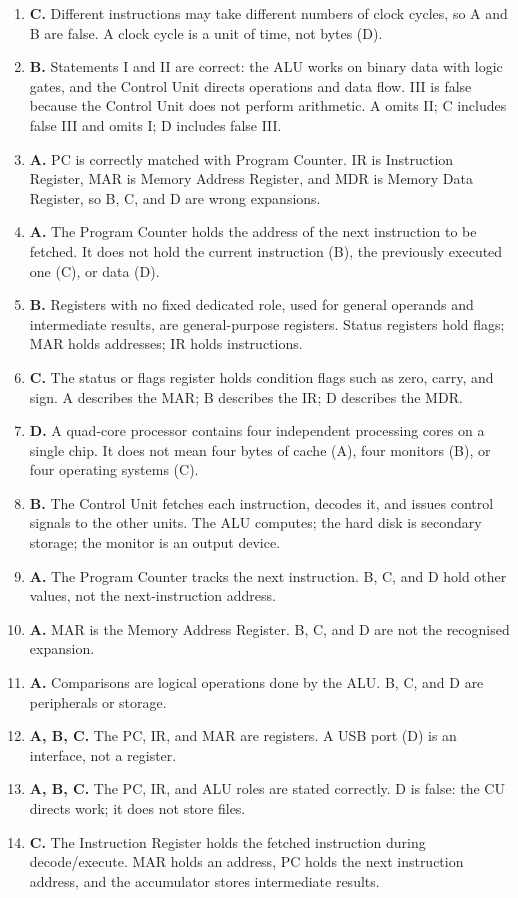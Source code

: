 \begin{enumerate}[label=\textbf{Q\arabic*.}, leftmargin=*]
  2.4 GHz is about 2.4 billion cycles per second. A, C, and D misstate the
  giga- scale.
\item \textbf{C.} Different instructions may take different numbers of clock
  cycles, so A and B are false. A clock cycle is a unit of time, not bytes
  (D).
\item \textbf{B.} Statements I and II are correct: the ALU works on binary
  data with logic gates, and the Control Unit directs operations and data
  flow. III is false because the Control Unit does not perform arithmetic.
  A omits II; C includes false III and omits I; D includes false III.
\item \textbf{A.} PC is correctly matched with Program Counter. IR is
  Instruction Register, MAR is Memory Address Register, and MDR is Memory
  Data Register, so B, C, and D are wrong expansions.
\item \textbf{A.} The Program Counter holds the address of the next
  instruction to be fetched. It does not hold the current instruction (B),
  the previously executed one (C), or data (D).
\item \textbf{B.} Registers with no fixed dedicated role, used for general
  operands and intermediate results, are general-purpose registers. Status
  registers hold flags; MAR holds addresses; IR holds instructions.
\item \textbf{C.} The status or flags register holds condition flags such as
  zero, carry, and sign. A describes the MAR; B describes the IR; D
  describes the MDR.
\item \textbf{D.} A quad-core processor contains four independent processing
  cores on a single chip. It does not mean four bytes of cache (A), four
  monitors (B), or four operating systems (C).
\item \textbf{B.} The Control Unit fetches each instruction, decodes it, and
  issues control signals to the other units. The ALU computes; the hard disk
  is secondary storage; the monitor is an output device.

\item \textbf{A.} The Program Counter tracks the next instruction. B, C, and D hold other values, not the next-instruction address.
\item \textbf{A.} MAR is the Memory Address Register. B, C, and D are not the recognised expansion.
\item \textbf{A.} Comparisons are logical operations done by the ALU. B, C, and D are peripherals or storage.
\item \textbf{A, B, C.} The PC, IR, and MAR are registers. A USB port (D) is an interface, not a register.
\item \textbf{A, B, C.} The PC, IR, and ALU roles are stated correctly. D is false: the CU directs work; it does not store files.
\item \textbf{C.} The Instruction Register holds the fetched instruction during decode/execute. MAR holds an address, PC holds the next instruction address, and the accumulator stores intermediate results.


\end{enumerate}
